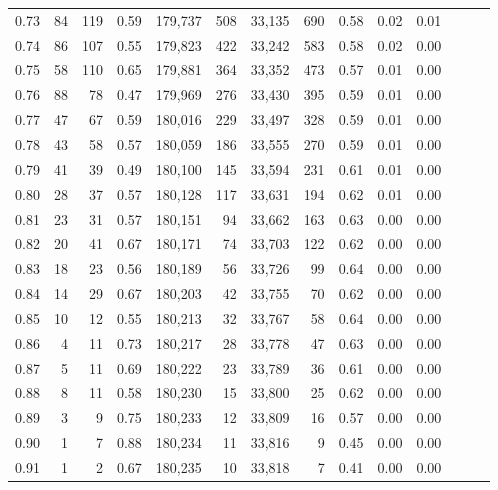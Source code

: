\begin{tabular}{rrrrrrrrrrrrrr}
0.73 &     84 &  119 &  0.59 &  179,737 &      508 &  33,135 &     690 &  0.58 &  0.02 &      0.01 \\
0.74 &     86 &  107 &  0.55 &  179,823 &      422 &  33,242 &     583 &  0.58 &  0.02 &      0.00 \\
0.75 &     58 &  110 &  0.65 &  179,881 &      364 &  33,352 &     473 &  0.57 &  0.01 &      0.00 \\
0.76 &     88 &   78 &  0.47 &  179,969 &      276 &  33,430 &     395 &  0.59 &  0.01 &      0.00 \\
0.77 &     47 &   67 &  0.59 &  180,016 &      229 &  33,497 &     328 &  0.59 &  0.01 &      0.00 \\
0.78 &     43 &   58 &  0.57 &  180,059 &      186 &  33,555 &     270 &  0.59 &  0.01 &      0.00 \\
0.79 &     41 &   39 &  0.49 &  180,100 &      145 &  33,594 &     231 &  0.61 &  0.01 &      0.00 \\
0.80 &     28 &   37 &  0.57 &  180,128 &      117 &  33,631 &     194 &  0.62 &  0.01 &      0.00 \\
0.81 &     23 &   31 &  0.57 &  180,151 &       94 &  33,662 &     163 &  0.63 &  0.00 &      0.00 \\
0.82 &     20 &   41 &  0.67 &  180,171 &       74 &  33,703 &     122 &  0.62 &  0.00 &      0.00 \\
0.83 &     18 &   23 &  0.56 &  180,189 &       56 &  33,726 &      99 &  0.64 &  0.00 &      0.00 \\
0.84 &     14 &   29 &  0.67 &  180,203 &       42 &  33,755 &      70 &  0.62 &  0.00 &      0.00 \\
0.85 &     10 &   12 &  0.55 &  180,213 &       32 &  33,767 &      58 &  0.64 &  0.00 &      0.00 \\
0.86 &      4 &   11 &  0.73 &  180,217 &       28 &  33,778 &      47 &  0.63 &  0.00 &      0.00 \\
0.87 &      5 &   11 &  0.69 &  180,222 &       23 &  33,789 &      36 &  0.61 &  0.00 &      0.00 \\
0.88 &      8 &   11 &  0.58 &  180,230 &       15 &  33,800 &      25 &  0.62 &  0.00 &      0.00 \\
0.89 &      3 &    9 &  0.75 &  180,233 &       12 &  33,809 &      16 &  0.57 &  0.00 &      0.00 \\
0.90 &      1 &    7 &  0.88 &  180,234 &       11 &  33,816 &       9 &  0.45 &  0.00 &      0.00 \\
0.91 &      1 &    2 &  0.67 &  180,235 &       10 &  33,818 &       7 &  0.41 &  0.00 &      0.00 \\

\end{tabular}
